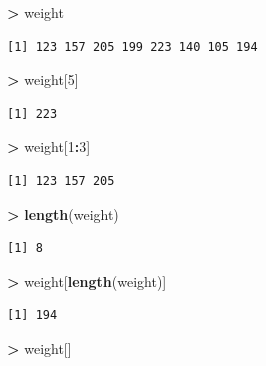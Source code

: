 \documentclass[]{krantz}
\makeatletter
\newenvironment{Shaded}{\begin{snugshade}}{\end{snugshade}}
\newcommand{\DecValTok}[1]{\textcolor[rgb]{0.06,0.06,0.06}{#1}}
\newcommand{\KeywordTok}[1]{\textcolor[rgb]{0.27,0.27,0.27}{\textbf{#1}}}
\newcommand{\NormalTok}[1]{#1}
\newcommand{\OperatorTok}[1]{\textcolor[rgb]{0.43,0.43,0.43}{\textbf{#1}}}
\newcommand{\StringTok}[1]{\textcolor[rgb]{0.5,0.5,0.5}{#1}}
\newenvironment{kframe}{%
\medskip{}
\setlength{\fboxsep}{.8em}
 \def\at@end@of@kframe{}%
 \ifinner\ifhmode%
  \def\at@end@of@kframe{\end{minipage}}%
  \begin{minipage}{\columnwidth}%
 \fi\fi%
 \def\FrameCommand##1{\hskip\@totalleftmargin \hskip-\fboxsep
 \colorbox{shadecolor}{##1}\hskip-\fboxsep
     \hskip-\linewidth \hskip-\@totalleftmargin \hskip\columnwidth}%
 \MakeFramed {\advance\hsize-\width
   \@totalleftmargin\z@ \linewidth\hsize
   \@setminipage}}%
 {\par\unskip\endMakeFramed%
 \at@end@of@kframe}
\renewenvironment{Shaded}{\begin{kframe}}{\end{kframe}}
\makeatother
\begin{document}
\begin{Shaded}
\begin{Highlighting}[]
\OperatorTok{>}\StringTok{ }\NormalTok{weight}
\end{Highlighting}
\end{Shaded}

\begin{verbatim}
[1] 123 157 205 199 223 140 105 194
\end{verbatim}

\begin{Shaded}
\begin{Highlighting}[]
\OperatorTok{>}\StringTok{ }\NormalTok{weight[}\DecValTok{5}\NormalTok{]}
\end{Highlighting}
\end{Shaded}

\begin{verbatim}
[1] 223
\end{verbatim}

\begin{Shaded}
\begin{Highlighting}[]
\OperatorTok{>}\StringTok{ }\NormalTok{weight[}\DecValTok{1}\OperatorTok{:}\DecValTok{3}\NormalTok{]}
\end{Highlighting}
\end{Shaded}

\begin{verbatim}
[1] 123 157 205
\end{verbatim}

\begin{Shaded}
\begin{Highlighting}[]
\OperatorTok{>}\StringTok{ }\KeywordTok{length}\NormalTok{(weight)}
\end{Highlighting}
\end{Shaded}

\begin{verbatim}
[1] 8
\end{verbatim}

\begin{Shaded}
\begin{Highlighting}[]
\OperatorTok{>}\StringTok{ }\NormalTok{weight[}\KeywordTok{length}\NormalTok{(weight)]}
\end{Highlighting}
\end{Shaded}

\begin{verbatim}
[1] 194
\end{verbatim}

\begin{Shaded}
\begin{Highlighting}[]
\OperatorTok{>}\StringTok{ }\NormalTok{weight[]}
\end{Highlighting}
\end{Shaded}
\end{document}
